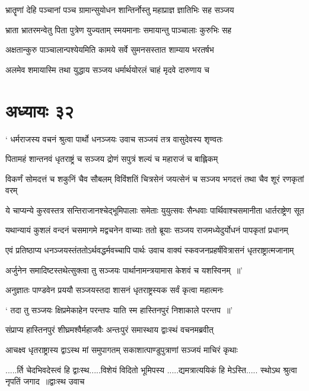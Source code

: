 \twolineshloka
{भ्रातॄणां देहि पञ्चानां पञ्च ग्रामान्सुयोधन}
{शान्तिर्नोस्तु महाप्राज्ञ ज्ञातिभिः सह सञ्जय}


\twolineshloka
{भ्राता भ्रातरमन्वेतु पिता पुत्रेण युज्यताम्}
{स्मयमानाः समायान्तु पाञ्चालाः कुरुभिः सह}


\twolineshloka
{अक्षतान्कुरु पाञ्चालान्पश्येयमिति कामये}
{सर्वे सुमनसस्तात शाम्याय भरतर्षभ}


\twolineshloka
{अलमेव शमायास्मि तथा युद्धाय सञ्जय}
{धर्मार्थयोरलं चाहं मृदवे दारुणाय च}


\chapter{अध्यायः ३२}
\twolineshloka
{` धर्मराजस्य वचनं श्रुत्वा पार्थो धनञ्जयः}
{उवाच सञ्जयं तत्र वासुदेवस्य शृण्वतः}


\twolineshloka
{पितामहं शान्तनवं धृतराष्ट्रं च सञ्जय}
{द्रोणं सपुत्रं शल्यं च महाराजं च बाह्लिकम्}


\threelineshloka
{विकर्णं सोमदत्तं च शकुनिं चैव सौबलम्}
{विविंशतिं चित्रसेनं जयत्सेनं च सञ्जय}
{भगदत्तं तथा चैव शूरं रणकृतां वरम्}


\twolineshloka
{ये चाप्यन्ये कुरवस्तत्र सन्तिराजानश्चेद्भूमिपालाः समेताः}
{युयुत्सवः सैन्धवाः पार्थिवाश्चसमानीता धार्तराष्ट्रेण सूत}


\twolineshloka
{यथान्यायं कुशलं वन्दनं चसमागमे मद्वचनेन वाच्याः}
{ततो ब्रूयाः सञ्जय राजमध्येदुर्योधनं पापकृतां प्रधानम्}


\twolineshloka
{एवं प्रतिष्ठाप्य धनञ्जयस्तंततोऽर्थवद्धर्मवच्चापि पार्थः}
{उवाच वाक्यं स्कवजनप्रहर्षंवित्रासनं धृतराष्ट्रात्मजानाम्}


\twolineshloka
{अर्जुनेन समादिष्टस्तथेत्सुक्त्वा तु सञ्जयः}
{पार्थानामन्त्रयामास केशवं च यशस्विनम् ॥'}


\twolineshloka
{अनुज्ञातः पाण्डवेन प्रययौ सञ्जयस्तदा}
{शासनं धृतराष्ट्रस्यक सर्वं कृत्वा महात्मनः}


\twolineshloka
{` तदा तु सञ्जयः क्षिप्रमेकाहेन परन्तपः}
{याति स्म हास्तिनपुरं निशाकाले परन्तप ॥'}


\twolineshloka
{संप्राप्य हास्तिनपुरं शीघ्रमश्वैर्महाजवैः}
{अन्तःपुरं समास्थाय द्वाःस्थं वचनमब्रवीत्}


\twolineshloka
{आचक्ष्व धृतराष्ट्रास्य द्वाऽस्थ मां समुपागतम्}
{सकाशात्पाण्डुपुत्राणां सञ्जयं माचिरं कृथाः}


\threelineshloka
{.....र्ति चेदभिवदेस्त्वं हि द्वाःस्थ.....विशेयं विदितो भूमिपस्य}
{.....द्यमत्रात्ययिकं हि मेऽस्ति..... स्थोऽथ श्रुत्वा नृपतिं जगाद ॥द्वाःस्थ उवाच}
{}


